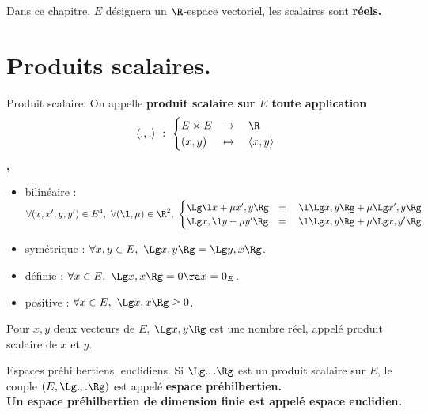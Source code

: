 \documentclass[11pt]{article}
\begin{document}


Dans ce chapitre, $E$ désignera un $\R$-espace vectoriel, les scalaires sont \bf{réels}.

\section{Produits scalaires.}

\begin{defi}{Produit scalaire.}{}
    On appelle \bf{produit scalaire} sur $E$ toute application
    \begin{equation*}
        \langle .,. \rangle ~ : ~ \begin{cases} E\times E &\to \quad \R \\ (x,y) &\mapsto \quad \langle x, y \rangle\end{cases}
    \end{equation*},
    \begin{itemize}[topsep=0pt,itemsep=-0.9 ex]
        \item bilinéaire : $\forall(x,x',y,y')\in E^4, ~ \forall(\l,\mu)\in\R^2, ~ \begin{cases}\Lg\l x + \mu x', y\Rg &= \quad \l\Lg x,y \Rg + \mu\Lg x', y \Rg\\\Lg x, \l y + \mu y' \Rg &= \quad \l\Lg x, y \Rg + \mu \Lg x, y' \Rg\end{cases}$
        \item symétrique : $\forall x,y\in E, ~ \Lg x, y \Rg = \Lg y, x \Rg$.
        \item définie : $\forall x \in E, ~ \Lg x, x \Rg = 0 \ra x = 0_E$.
        \item positive : $\forall x \in E, ~ \Lg x, x \Rg \geq 0$.
    \end{itemize}
    Pour $x,y$ deux vecteurs de $E$, $\Lg x, y\Rg$ est une nombre réel, appelé produit scalaire de $x$ et $y$.
\end{defi}

\begin{defi}{Espaces préhilbertiens, euclidiens.}{}
    Si $\Lg .,.\Rg$ est un produit scalaire sur $E$, le couple $(E,\Lg.,.\Rg)$ est appelé \bf{espace préhilbertien}.\\
    Un espace préhilbertien de dimension finie est appelé \bf{espace euclidien}.
\end{defi}
\end{document}
